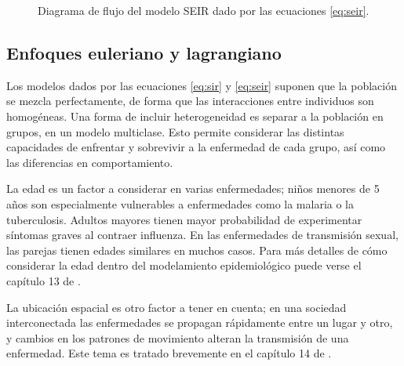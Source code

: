 \begin{figure}[!h]
\centering
{}
\caption{Diagrama de flujo del modelo SEIR dado por las ecuaciones \ref{eq:seir}.} \label{fig:seir}
\end{figure}



\subsection{Enfoques euleriano y lagrangiano}\label{subsec:euler-lag}

Los modelos dados por las ecuaciones \ref{eq:sir} y \ref{eq:seir} suponen que la población se mezcla perfectamente, de forma que las interacciones entre individuos son homogéneas. Una forma de incluir heterogeneidad es separar a la población en grupos, en un modelo multiclase. Esto permite considerar las distintas capacidades de enfrentar y sobrevivir a la enfermedad de cada grupo, así como las diferencias en comportamiento.

La edad es un factor a considerar en varias enfermedades; niños menores de 5 años son especialmente vulnerables a enfermedades como la malaria o la tuberculosis. Adultos mayores tienen mayor probabilidad de experimentar síntomas graves al contraer influenza. En las enfermedades de transmisión sexual, las parejas tienen edades similares en muchos casos. Para más detalles de cómo considerar la edad dentro del modelamiento epidemiológico puede verse el capítulo 13 de \cite{Brauer2019}.

La ubicación espacial es otro factor a tener en cuenta; en una sociedad interconectada las enfermedades se propagan rápidamente entre un lugar y otro, y cambios en los patrones de movimiento alteran la transmisión de una enfermedad. Este tema es tratado brevemente en el capítulo 14 de \cite{Brauer2019}.

